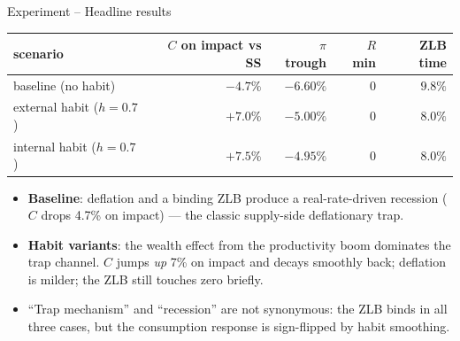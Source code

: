 \documentclass[11pt,aspectratio=169]{beamer}
\begin{document}
\begin{frame}{Experiment -- Headline results}

\begin{center}
\small
\renewcommand{\arraystretch}{1.3}
\begin{tabular}{lrrrr}
\toprule
scenario & $C$ on impact vs SS & $\pi$ trough & $R$ min & ZLB time \\
\midrule
baseline (no habit)        & $-4.7\%$ & $-6.60\%$ & $0$ & $9.8\%$ \\
external habit ($h=0.7$)   & $+7.0\%$ & $-5.00\%$ & $0$ & $8.0\%$ \\
internal habit ($h=0.7$)   & $+7.5\%$ & $-4.95\%$ & $0$ & $8.0\%$ \\
\bottomrule
\end{tabular}
\end{center}

\medskip

\begin{itemize}

\item \textbf{Baseline}: deflation and a binding ZLB produce a
  real-rate-driven recession ($C$ drops 4.7\% on impact) --- the
  classic supply-side deflationary trap.\newline

\item \textbf{Habit variants}: the wealth effect from the productivity
  boom dominates the trap channel. $C$ jumps \emph{up} 7\% on impact
  and decays smoothly back; deflation is milder; the ZLB still touches
  zero briefly.\newline

\item ``Trap mechanism'' and ``recession'' are not synonymous: the ZLB
  binds in all three cases, but the consumption response is sign-flipped
  by habit smoothing.

\end{itemize}

\end{frame}
\end{document}
